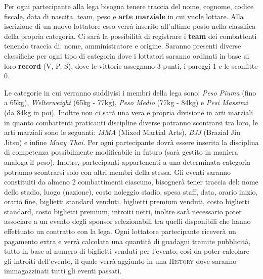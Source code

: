 \documentclass[a4paper,12pt]{report}
\begin{document}
Per ogni partecipante alla lega bisogna tenere traccia del nome, cognome, codice fiscale, data di nascita, team, peso e \textbf{arte 
marziale} in cui vuole lottare. Alla iscrizione di un nuovo lottatore esso verrà inserito all'ultimo 
posto nella classifica della propria categoria. Ci sarà la possibilità di registrare i \textbf{team} dei combattenti tenendo traccia di: nome, amministratore e 
origine. Saranno presenti diverse classifiche per ogni tipo di categoria dove i lottatori saranno ordinati 
in base ai loro \textbf{record} (V, P, S), dove le vittorie assegnano 3 punti, i pareggi 1 e le sconfitte 0.\par
Le categorie in cui verranno suddivisi i membri della lega sono: \textit{Peso Piuma} (fino a 65kg), \textit{Welterweight} 
(65kg - 77kg), \textit{Peso Medio} (77kg - 84kg) e \textit{Pesi Massimi} (da 84kg in poi). Inoltre non ci sarà una vera e propria 
divisione in arti marziali in quanto combattenti praticanti discipline diverse potranno scontrarsi tra loro, le arti marziali sono le 
seguanti: \textit{MMA} (Mixed Martial Arts), \textit{BJJ} (Brazial Jiu Jitsu) e infine \textit{Muay Thai}. Per ogni 
partecipante dovrà essere inserita la disciplina di competenza possibilmente modificabile in futuro (sarà gestito in maniera 
analoga il peso). Inoltre, partecipanti appartenenti a una determinata categoria potranno scontrarsi solo con altri membri 
della stessa. Gli eventi saranno constituiti da almeno 2 combattimenti ciascuno, bisognerà tener traccia del: nome dello stadio, 
luogo (nazione), costo noleggio stadio, spesa staff, data, orario inizio, orario fine, biglietti standard venduti, biglietti 
premium venduti, costo biglietti standard, costo biglietti premium, introiti netti, inoltre sarà necessario poter associare a un 
evento degli sponsor selezionabili tra quelli disponibili che hanno effettuato un contratto con la lega. Ogni lottatore partecipante 
riceverà un pagamento extra e verrà calcolata una quantità di guadagni tramite pubblicità, tutto in base al numero di biglietti 
venduti per l'evento, così da poter calcolare gli introiti dell'evento, il quale verrà aggiunto in una \textsc{History} dove saranno 
immagazzinati tutti gli eventi passati.
\end{document}
